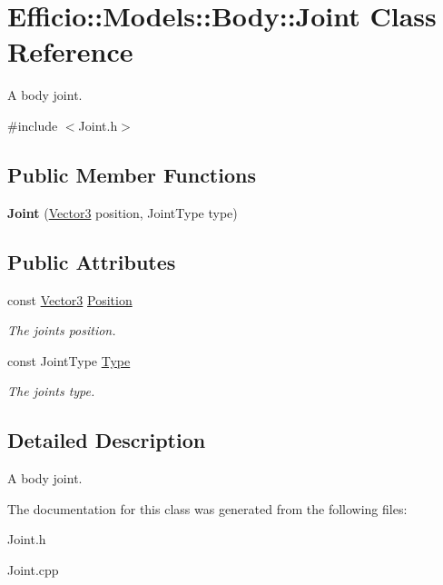 \hypertarget{class_efficio_1_1_models_1_1_body_1_1_joint}{}\section{Efficio\+:\+:Models\+:\+:Body\+:\+:Joint Class Reference}
\label{class_efficio_1_1_models_1_1_body_1_1_joint}


A body joint.  




{\ttfamily \#include $<$Joint.\+h$>$}

\subsection*{Public Member Functions}
\begin{DoxyCompactItemize}
\item 
{\bfseries Joint} (\hyperlink{class_efficio_1_1_vector3}{Vector3} position, Joint\+Type type)\hypertarget{class_efficio_1_1_models_1_1_body_1_1_joint_a66f6fb9f3a3471e3aeff48d4b9d8bb00}{}\label{class_efficio_1_1_models_1_1_body_1_1_joint_a66f6fb9f3a3471e3aeff48d4b9d8bb00}

\end{DoxyCompactItemize}
\subsection*{Public Attributes}
\begin{DoxyCompactItemize}
\item 
const \hyperlink{class_efficio_1_1_vector3}{Vector3} \hyperlink{class_efficio_1_1_models_1_1_body_1_1_joint_ac84f303a9a068a3f8965272ebd29a61f}{Position}\hypertarget{class_efficio_1_1_models_1_1_body_1_1_joint_ac84f303a9a068a3f8965272ebd29a61f}{}\label{class_efficio_1_1_models_1_1_body_1_1_joint_ac84f303a9a068a3f8965272ebd29a61f}

\begin{DoxyCompactList}\small\item\em The joint\textquotesingle{}s position. \end{DoxyCompactList}\item 
const Joint\+Type \hyperlink{class_efficio_1_1_models_1_1_body_1_1_joint_a9f2798067842f2416f30042eb2512c02}{Type}\hypertarget{class_efficio_1_1_models_1_1_body_1_1_joint_a9f2798067842f2416f30042eb2512c02}{}\label{class_efficio_1_1_models_1_1_body_1_1_joint_a9f2798067842f2416f30042eb2512c02}

\begin{DoxyCompactList}\small\item\em The joint\textquotesingle{}s type. \end{DoxyCompactList}\end{DoxyCompactItemize}


\subsection{Detailed Description}
A body joint. 

The documentation for this class was generated from the following files\+:\begin{DoxyCompactItemize}
\item 
Joint.\+h\item 
Joint.\+cpp\end{DoxyCompactItemize}

